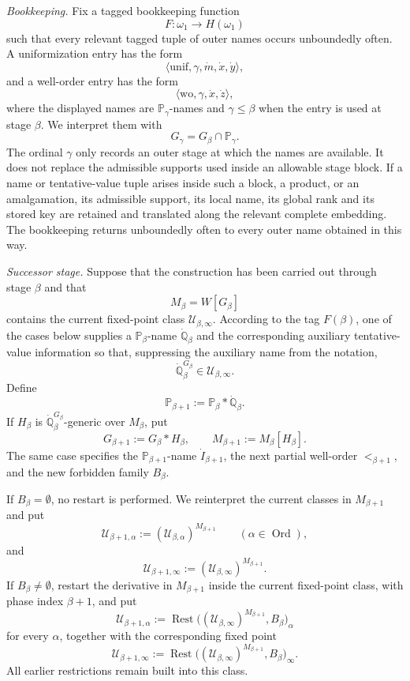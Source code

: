 \documentclass[a4paper,11pt]{article}
\newcommand{\forceP}{\mathbb{P}}
\newcommand{\forceQ}{\mathbb{Q}}
\begin{document}
\medskip
\noindent
\emph{Bookkeeping.}
Fix a tagged bookkeeping function
\[
F:\omega_1\longrightarrow H(\omega_1)
\]
such that every relevant tagged tuple of outer names occurs unboundedly often. A uniformization entry has the form
\[
\langle\mathrm{unif},\gamma,\dot m,\dot x,\dot y\rangle,
\]
and a well-order entry has the form
\[
\langle\mathrm{wo},\gamma,\dot x,\dot z\rangle,
\]
where the displayed names are $\forceP_\gamma$-names and $\gamma\leq\beta$ when the entry is used at stage $\beta$. We interpret them with
\[
G_\gamma=G_\beta\cap\forceP_\gamma.
\]
The ordinal $\gamma$ only records an outer stage at which the names are available. It does not replace the admissible supports used inside an allowable stage block. If a name or tentative-value tuple arises inside such a block, a product, or an amalgamation, its admissible support, its local name, its global rank and its stored key are retained and translated along the relevant complete embedding. The bookkeeping returns unboundedly often to every outer name obtained in this way.

\medskip
\noindent
\emph{Successor stage.}
Suppose that the construction has been carried out through stage $\beta$ and that
\[
M_\beta=W[G_\beta]
\]
contains the current fixed-point class $\mathcal U_{\beta,\infty}$. According to the tag $F(\beta)$, one of the cases below supplies a $\forceP_\beta$-name $\dot{\forceQ}_\beta$ and the corresponding auxiliary tentative-value information so that, suppressing the auxiliary name from the notation,
\[
\dot{\forceQ}_\beta^{G_\beta}\in\mathcal U_{\beta,\infty}.
\]
Define
\[
\forceP_{\beta+1}:=\forceP_\beta*\dot{\forceQ}_\beta.
\]
If $H_\beta$ is $\dot{\forceQ}_\beta^{G_\beta}$-generic over $M_\beta$, put
\[
G_{\beta+1}:=G_\beta*H_\beta,
\qquad
M_{\beta+1}:=M_\beta[H_\beta].
\]
The same case specifies the $\forceP_{\beta+1}$-name $\dot I_{\beta+1}$, the next partial well-order $<_{\beta+1}$, and the new forbidden family $B_\beta$.

If $B_\beta=\emptyset$, no restart is performed. We reinterpret the current classes in $M_{\beta+1}$ and put
\[
\mathcal U_{\beta+1,\alpha}
:=(\mathcal U_{\beta,\alpha})^{M_{\beta+1}}
\qquad(\alpha\in\operatorname{Ord}),
\]
and
\[
\mathcal U_{\beta+1,\infty}
:=(\mathcal U_{\beta,\infty})^{M_{\beta+1}}.
\]
If $B_\beta\neq\emptyset$, restart the derivative in $M_{\beta+1}$ inside the current fixed-point class, with phase index $\beta+1$, and put
\[
\mathcal U_{\beta+1,\alpha}
:=
\operatorname{Rest}\bigl((\mathcal U_{\beta,\infty})^{M_{\beta+1}},B_\beta\bigr)_\alpha
\]
for every $\alpha$, together with the corresponding fixed point
\[
\mathcal U_{\beta+1,\infty}
:=
\operatorname{Rest}\bigl((\mathcal U_{\beta,\infty})^{M_{\beta+1}},B_\beta\bigr)_\infty.
\]
All earlier restrictions remain built into this class.
\end{document}
